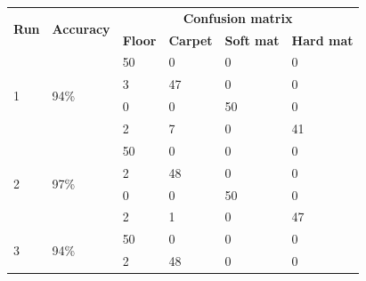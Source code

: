 \documentclass[USenglish]{ifimaster}  %
\begin{document}
\begin{table}[h]\ContinuedFloat
	\begin{subtable}[h]{1\textwidth} 
		\centering
		\captionsetup{justification=centering}
		\begin{tabular}{@{}llllll@{}}
			\toprule
			\multirow{2}{*}{\textbf{Run}} & \multirow{2}{*}{\textbf{Accuracy}} & \multicolumn{4}{c}{\textbf{Confusion matrix}} \\ \cmidrule(l){3-6} 
			&  & \multicolumn{1}{l|}{\textbf{Floor}} & \multicolumn{1}{l|}{\textbf{Carpet}} & \multicolumn{1}{l|}{\textbf{Soft mat}} & \textbf{Hard mat} \\ \midrule
			\multicolumn{1}{l|}{\multirow{4}{*}{1}} & \multicolumn{1}{l|}{\multirow{4}{*}{94\%}} & \multicolumn{1}{l|}{50} & \multicolumn{1}{l|}{0} & \multicolumn{1}{l|}{0} & 0 \\ \cmidrule(l){3-6} 
			\multicolumn{1}{l|}{} & \multicolumn{1}{l|}{} & \multicolumn{1}{l|}{3} & \multicolumn{1}{l|}{47} & \multicolumn{1}{l|}{0} & 0 \\ \cmidrule(l){3-6} 
			\multicolumn{1}{l|}{} & \multicolumn{1}{l|}{} & \multicolumn{1}{l|}{0} & \multicolumn{1}{l|}{0} & \multicolumn{1}{l|}{50} & 0 \\ \cmidrule(l){3-6} 
			\multicolumn{1}{l|}{} & \multicolumn{1}{l|}{} & \multicolumn{1}{l|}{2} & \multicolumn{1}{l|}{7} & \multicolumn{1}{l|}{0} & 41 \\ \midrule
			\multicolumn{1}{l|}{\multirow{4}{*}{2}} & \multicolumn{1}{l|}{\multirow{4}{*}{97\%}} & \multicolumn{1}{l|}{50} & \multicolumn{1}{l|}{0} & \multicolumn{1}{l|}{0} & 0 \\ \cmidrule(l){3-6} 
			\multicolumn{1}{l|}{} & \multicolumn{1}{l|}{} & \multicolumn{1}{l|}{2} & \multicolumn{1}{l|}{48} & \multicolumn{1}{l|}{0} & 0 \\ \cmidrule(l){3-6} 
			\multicolumn{1}{l|}{} & \multicolumn{1}{l|}{} & \multicolumn{1}{l|}{0} & \multicolumn{1}{l|}{0} & \multicolumn{1}{l|}{50} & 0 \\ \cmidrule(l){3-6} 
			\multicolumn{1}{l|}{} & \multicolumn{1}{l|}{} & \multicolumn{1}{l|}{2} & \multicolumn{1}{l|}{1} & \multicolumn{1}{l|}{0} & 47 \\ \midrule
			\multicolumn{1}{l|}{\multirow{4}{*}{3}} & \multicolumn{1}{l|}{\multirow{4}{*}{94\%}} & \multicolumn{1}{l|}{50} & \multicolumn{1}{l|}{0} & \multicolumn{1}{l|}{0} & 0 \\ \cmidrule(l){3-6} 
			\multicolumn{1}{l|}{} & \multicolumn{1}{l|}{} & \multicolumn{1}{l|}{2} & \multicolumn{1}{l|}{48} & \multicolumn{1}{l|}{0} & 0 \\ \cmidrule(l){3-6} 

\end{tabular}
\end{subtable}
\end{table}
\end{document}
